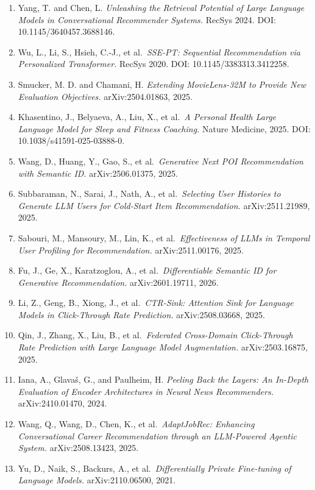 \begin{enumerate}
  Gao, Y., Xiong, Y., Gao, X., et al.~\emph{Retrieval-Augmented Generation for Large Language Models: A Survey.} arXiv:2312.10997, 2023.
\item
  Yang, T. and Chen, L. \emph{Unleashing the Retrieval Potential of Large Language Models in Conversational Recommender Systems.} RecSys 2024. DOI: 10.1145/3640457.3688146.
\item
  Wu, L., Li, S., Hsieh, C.-J., et al.~\emph{SSE-PT: Sequential Recommendation via Personalized Transformer.} RecSys 2020. DOI: 10.1145/3383313.3412258.
\item
  Smucker, M. D. and Chamani, H. \emph{Extending MovieLens-32M to Provide New Evaluation Objectives.} arXiv:2504.01863, 2025.
\item
  Khasentino, J., Belyaeva, A., Liu, X., et al.~\emph{A Personal Health Large Language Model for Sleep and Fitness Coaching.} Nature Medicine, 2025. DOI: 10.1038/s41591-025-03888-0.
\item
  Wang, D., Huang, Y., Gao, S., et al.~\emph{Generative Next POI Recommendation with Semantic ID.} arXiv:2506.01375, 2025.
\item
  Subbaraman, N., Sarai, J., Nath, A., et al.~\emph{Selecting User Histories to Generate LLM Users for Cold-Start Item Recommendation.} arXiv:2511.21989, 2025.
\item
  Sabouri, M., Mansoury, M., Lin, K., et al.~\emph{Effectiveness of LLMs in Temporal User Profiling for Recommendation.} arXiv:2511.00176, 2025.
\item
  Fu, J., Ge, X., Karatzoglou, A., et al.~\emph{Differentiable Semantic ID for Generative Recommendation.} arXiv:2601.19711, 2026.
\item
  Li, Z., Geng, B., Xiong, J., et al.~\emph{CTR-Sink: Attention Sink for Language Models in Click-Through Rate Prediction.} arXiv:2508.03668, 2025.
\item
  Qin, J., Zhang, X., Liu, B., et al.~\emph{Federated Cross-Domain Click-Through Rate Prediction with Large Language Model Augmentation.} arXiv:2503.16875, 2025.
\item
  Iana, A., Glavaš, G., and Paulheim, H. \emph{Peeling Back the Layers: An In-Depth Evaluation of Encoder Architectures in Neural News Recommenders.} arXiv:2410.01470, 2024.
\item
  Wang, Q., Wang, D., Chen, K., et al.~\emph{AdaptJobRec: Enhancing Conversational Career Recommendation through an LLM-Powered Agentic System.} arXiv:2508.13423, 2025.
\item
  Yu, D., Naik, S., Backurs, A., et al.~\emph{Differentially Private Fine-tuning of Language Models.} arXiv:2110.06500, 2021.

\end{enumerate}
